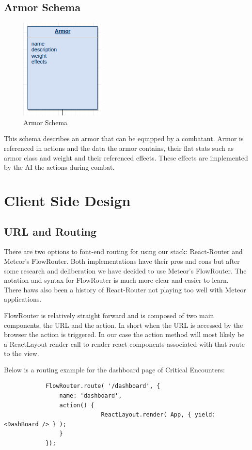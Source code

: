 \documentclass[12pt,a4paper]{report}
\begin{document}
\subsection {Armor Schema}
\begin{figure}[H]
	\centering
	\includegraphics[scale=.9]{schema-armor}
	\caption{Armor Schema}
	\label{fig: Armor Schema }
\end{figure}
This schema describes an armor that can be equipped by a combatant. Armor is referenced in actions and the data the armor contains, their flat stats such as armor class and weight and their referenced effects. These effects are implemented by the AI the actions during combat.
\newpage
\section{Client Side Design}

	\subsection{URL and Routing}
		There are two options to font-end routing for using our stack: React-Router and Meteor's FlowRouter. Both implementations have their pros and cons but after some research and deliberation we have decided to use Meteor's FlowRouter. The notation and syntax for FlowRouter is much more clear and easier to learn. There haws also been a history of React-Router not playing too well with Meteor applications. \cite{routing}
		
		FlowRouter is relatively straight forward and is composed of two main components, the URL and the action. In short when the URL is accessed by the browser the action is triggered. In our case the action method will most likely be a ReactLayout render call to render react components associated with that route to the view.
		
		Below is a routing example for the dashboard page of Critical Encounters:
		
		\begin{lstlisting}
			FlowRouter.route( '/dashboard', {
				name: 'dashboard',
				action() {
							ReactLayout.render( App, { yield: <DashBoard /> } );
				}
			});
		\end{lstlisting}
		
\end{document}
